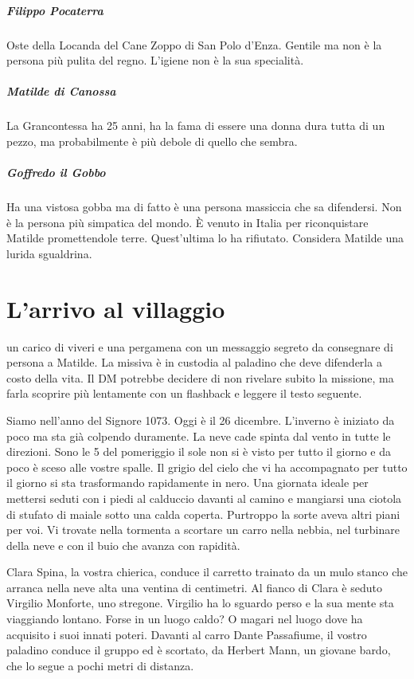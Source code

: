 \documentclass[letterpaper,twocolumn,openany,nodeprecatedcode]{dndbook}
\begin{document}
\paragraph{Filippo Pocaterra} Oste della Locanda del Cane Zoppo di San Polo d'Enza. Gentile ma non è la persona più pulita del regno. L'igiene non è la sua specialità.

\paragraph{Matilde di Canossa} La Grancontessa ha 25 anni, ha la fama di essere una donna dura tutta di un pezzo, ma probabilmente è più debole di quello che sembra.

\paragraph{Goffredo il Gobbo} Ha una vistosa gobba ma di fatto è una persona massiccia che sa difendersi. Non è la persona più simpatica del mondo. È venuto in Italia per riconquistare Matilde promettendole terre. Quest'ultima lo ha rifiutato. Considera Matilde una lurida sgualdrina.


\chapter{L'arrivo al villaggio}
 un carico di viveri e una pergamena con un messaggio segreto da consegnare di persona a Matilde. La missiva è in custodia al paladino che deve difenderla a costo della vita. Il DM potrebbe decidere di non rivelare subito la missione, ma farla scoprire più lentamente con un flashback e leggere il testo seguente.

\begin{DndReadAloud}
Siamo nell'anno del Signore 1073. Oggi è il 26 dicembre. L'inverno è iniziato da poco ma sta già colpendo duramente. La neve cade spinta dal vento in tutte le direzioni. Sono le 5 del pomeriggio il sole non si è visto per tutto il giorno e da poco è sceso alle vostre spalle. Il grigio del cielo che vi ha accompagnato per tutto il giorno si sta trasformando rapidamente in nero. Una giornata ideale per mettersi seduti con i piedi al calduccio davanti al camino e mangiarsi una ciotola di stufato di maiale sotto una calda coperta. Purtroppo la sorte aveva altri piani per voi. Vi trovate nella tormenta a scortare un carro nella nebbia, nel turbinare della neve e con il buio che avanza con rapidità.

Clara Spina, la vostra chierica, conduce il carretto trainato da un mulo stanco che arranca nella neve alta una ventina di centimetri. Al fianco di Clara è seduto Virgilio Monforte, uno stregone. Virgilio ha lo sguardo perso e la sua mente sta viaggiando lontano. Forse in un luogo caldo? O magari nel luogo dove ha acquisito i suoi innati poteri. Davanti al carro Dante Passafiume, il vostro paladino conduce il gruppo ed è scortato, da Herbert Mann, un giovane bardo, che lo segue a pochi metri di distanza. 
\end{DndReadAloud}
\end{document}
